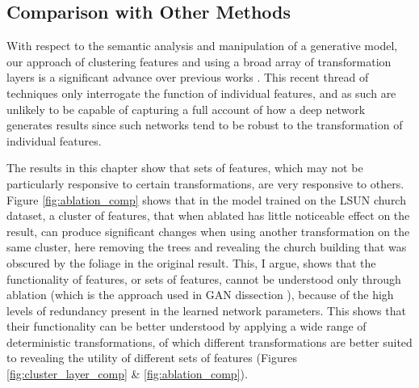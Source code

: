 \subsection{Comparison with Other Methods}

With respect to the semantic analysis and manipulation of a generative model, our approach of clustering features and using a broad array of transformation layers is a significant advance over previous works \citep{Bau2017-vg,Bau2018-td,bau2019semantic, Brink2019-gc}. 
This recent thread of techniques only interrogate the function of individual features, and as such are unlikely to be capable of capturing a full account of how a deep network generates results since such networks tend to be robust to the transformation of individual features. 

The results in this chapter show that sets of features, which may not be particularly responsive to certain transformations, are very responsive to others. 
Figure \ref{fig:ablation_comp} shows that in the model trained on the LSUN church dataset, a cluster of features, that when ablated has little noticeable effect on the result, can produce significant changes when using another transformation on the same cluster, here removing the trees and revealing the church building that was obscured by the foliage in the original result. 
This, I argue, shows that the functionality of features, or sets of features, cannot be understood only through ablation (which is the approach used in GAN dissection \citep{Bau2018-td}), because of the high levels of redundancy present in the learned network parameters. 
This shows that their functionality can be better understood by applying a wide range of deterministic transformations, of which different transformations are better suited to revealing the utility of different sets of features (Figures \ref{fig:cluster_layer_comp} \& \ref{fig:ablation_comp}).



